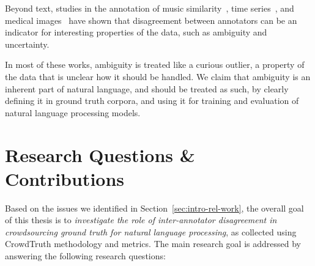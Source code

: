  Beyond text, studies in the annotation of music similarity~\cite{doi:10.1080/09298215.2016.1200631}, time series~\cite{schaekermann2016,schaekermann2018resolvable}, and medical images~\cite{cheplygina2018crowd} have shown that disagreement between annotators can be an indicator for interesting properties of the data, such as ambiguity and uncertainty.
 
 In most of these works, ambiguity is treated like a curious outlier, a property of the data that is unclear how it should be handled. We claim that ambiguity is an inherent part of natural language, and should be treated as such, by clearly defining it in ground truth corpora, and using it for training and evaluation of natural language processing models. %


\section{Research Questions \& Contributions}

Based on the issues we identified in Section~\ref{sec:intro-rel-work}, the overall goal of this thesis is to \textit{investigate the role of inter-annotator disagreement in crowdsourcing ground truth for natural language processing}, as collected using CrowdTruth methodology and metrics. The main research goal is addressed by answering the following research questions:

